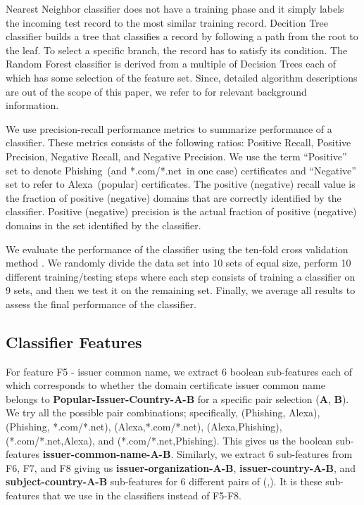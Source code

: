\documentclass[twocolumn]{article}
\newcommand{\Alexa}{\textsf{Alexa}}
\newcommand{\phishing}{\textsf{Phishing}}
\newcommand{\comnet}{\textsf{*.com/*.net}}
\begin{document}
Nearest Neighbor classifier does not have a training phase and it simply labels the incoming test record to the most similar training record. Decition Tree classifier builds a tree that classifies a record by following a path from the root to the leaf. To select a specific branch, the record has to satisfy its condition. The Random Forest classifier is derived from a multiple of Decision Trees each of which has some selection of the feature set. Since, detailed algorithm descriptions are out of the scope of this paper,
we refer to \cite{mlearn1,bagging,boost-bag-c4.5,boosting,boost-bag-c4.5}
for relevant background information. 

We use precision-recall performance metrics to summarize performance of a classifier. These metrics consists of the following
ratios: Positive Recall, Positive Precision, Negative Recall, and Negative Precision. We use the term ``Positive'' set to
denote \phishing\ (and  \comnet\ in one case) certificates  and ``Negative'' set to refer to \Alexa\ (popular) certificates.  The positive
(negative) recall value is the fraction of positive (negative) domains that are correctly identified by the classifier.
Positive (negative) precision is the actual fraction of positive (negative) domains in the set identified by the classifier.

We evaluate the performance of the classifier using the ten-fold cross validation method \cite{mlearn1}.
We randomly divide the data set into 10 sets of equal size, perform 10 different training/testing steps
where each step consists of training a classifier on 9 sets, and then we test it on the remaining set.
Finally, we average all results to assess the final performance of the classifier.

\subsection{Classifier Features}\label{sec:classfeatures}
For feature F5 - issuer common name, we extract 6 boolean sub-features each of which corresponds to whether the domain certificate issuer common name belongs to \textbf{Popular-Issuer-Country-A-B}  for a specific pair selection (\textbf{A}, \textbf{B}). We try all the possible pair combinations; specifically, (\phishing, \Alexa), (\phishing, \comnet), (\Alexa,\comnet), (\Alexa,\phishing), (\comnet,\Alexa), and (\comnet,\phishing). This gives us the boolean sub-features \textbf{issuer-common-name-A-B}. Similarly, we extract 6 sub-features from F6, F7, and F8 giving us \textbf{issuer-organization-A-B}, \textbf{issuer-country-A-B}, and \textbf{subject-country-A-B} sub-features for 6 different pairs of (,). It is these sub-features that we use in the classifiers instead of F5-F8. 
\end{document}
